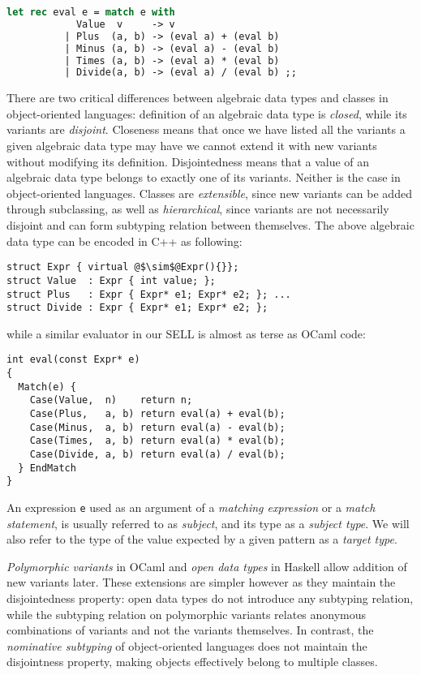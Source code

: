 \documentclass{llncs}
\makeatletter
\DeclareRobustCommand{\code}[1]{{\lstinline[keepspaces,breaklines=false,escapechar=@]{#1}}}
\makeatother
\begin{document}
\begin{lstlisting}[language=Caml,keepspaces,columns=flexible]
let rec eval e = match e with 
            Value  v     -> v 
          | Plus  (a, b) -> (eval a) + (eval b) 
          | Minus (a, b) -> (eval a) - (eval b)
          | Times (a, b) -> (eval a) * (eval b) 
          | Divide(a, b) -> (eval a) / (eval b) ;;
\end{lstlisting}

\noindent
There are two critical differences between algebraic data types and classes in 
object-oriented languages: definition of an algebraic data type is \emph{closed}, 
while its variants are \emph{disjoint}. Closeness means that once we have listed 
all the variants a given algebraic data type may have we cannot extend it with 
new variants without modifying its definition. Disjointedness means that a value 
of an algebraic data type belongs to exactly one of its variants. Neither is 
the case in object-oriented languages. Classes are \emph{extensible},
since new variants can be added through subclassing, as well as 
\emph{hierarchical}, since variants are not necessarily disjoint and can form 
subtyping relation between themselves. The above algebraic data type can be 
encoded in C++ as following:

\begin{lstlisting}[columns=flexible]
struct Expr { virtual @$\sim$@Expr(){}};
struct Value  : Expr { int value; };
struct Plus   : Expr { Expr* e1; Expr* e2; }; ...
struct Divide : Expr { Expr* e1; Expr* e2; };
\end{lstlisting}

\noindent
while a similar evaluator in our SELL is almost as terse as OCaml code:

\begin{lstlisting}[columns=flexible]
int eval(const Expr* e)
{
  Match(e) {
    Case(Value,  n)    return n;
    Case(Plus,   a, b) return eval(a) + eval(b); 
    Case(Minus,  a, b) return eval(a) - eval(b);
    Case(Times,  a, b) return eval(a) * eval(b); 
    Case(Divide, a, b) return eval(a) / eval(b);
  } EndMatch
}
\end{lstlisting}

\noindent
An expression \code{e} used as an argument of a \emph{matching expression} or a 
\emph{match statement}, is usually referred to as \emph{subject}, and its type 
as a \emph{subject type}. We will also refer to the type of the value expected 
by a given pattern as a \emph{target type}.

\emph{Polymorphic variants} in OCaml\cite{garrigue-98} and \emph{open data 
types} in Haskell\cite{LohHinze2006} allow addition of new variants later. 
These extensions are simpler however as they maintain the 
disjointedness property: open data types do not introduce any subtyping relation, 
while the subtyping relation on polymorphic variants relates anonymous 
combinations of variants and not the variants themselves. In contrast, 
the \emph{nominative subtyping} of object-oriented languages does not maintain 
the disjointness property, making objects effectively belong to multiple classes. 
\end{document}
